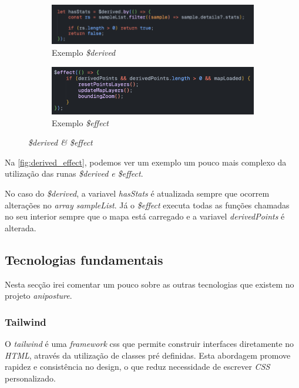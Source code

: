 \begin{figure}[!h]
	\centering
	\begin{subfigure}[c]{0.45\textwidth}
		\centering
		\includegraphics[width=\textwidth]{figs/derived.png}
		\caption{Exemplo \textit{\$derived}}
		\label{fig:derived}
	\end{subfigure}
	\hfill
	\begin{subfigure}[c]{0.45\textwidth}
		\centering
		\includegraphics[width=\textwidth]{figs/effect.png}
		\caption{Exemplo \textit{\$effect}}
		\label{fig:effect}
	\end{subfigure}
	\caption{\textit{\$derived \& \$effect}}
    \label{fig:derived_effect}
\end{figure}

Na \autoref{fig:derived_effect}, podemos ver um exemplo um pouco mais complexo da utilização das runas \textit{\$derived e \$effect}. 

No caso do \textit{\$derived}, a variavel \textit{hasStats} é atualizada sempre que ocorrem alterações no \textit{array sampleList}. Já o \textit{\$effect} executa todas as funções chamadas no seu interior sempre que o mapa está carregado e a variavel \textit{derivedPoints} é alterada.

\clearpage
\subsection{Tecnologias fundamentais}\label{sec:tec_fund_ani} %

Nesta secção irei comentar um pouco sobre as outras tecnologias que existem no projeto \textit{aniposture}. 

\subsubsection{\textbf{Tailwind}}
O \textit{tailwind} é uma \textit{framework} css que permite construir interfaces diretamente no \textit{HTML}, através da utilização de classes pré definidas. Esta abordagem promove rapidez e consistência no design, o que reduz necessidade de escrever \textit{CSS} personalizado.

